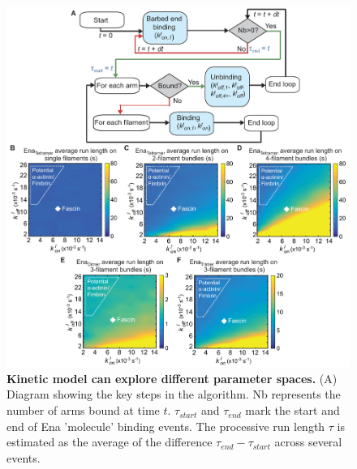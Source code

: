 \begin{figure}
\centering
\includegraphics[width=\textwidth]{img/ch02/Supp_Figure_4_PNAS.pdf}
\caption[Kinetic model can explore different parameter spaces.]{\textbf{Kinetic model can explore different parameter spaces.} (A) Diagram showing the key steps in the algorithm. Nb represents the number of arms bound at time $t$. $\tau_{start}$ and $\tau_{end}$ mark the start and end of Ena 'molecule' binding events. The processive run length $\tau$ is estimated as the average of the difference $\tau_{end} - \tau_{start}$ across several events. }
\label{fig:ena-si-model}
\end{figure}

\begin{figure}[!htb]
\end{figure}

